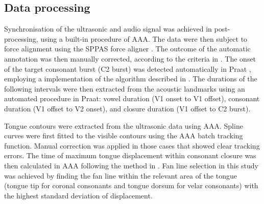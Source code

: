 \documentclass[authoryear, twocolumn]{elsarticle}
\begin{document}
\subsection{Data processing}\label{data-processing}

Synchronisation of the ultrasonic and audio signal was achieved in
post-processing, using a built-in procedure of AAA. The data were then
subject to force alignment using the SPPAS force aligner
\citep{bigi2015}. The outcome of the automatic annotation was then
manually corrected, according to the criteria in .
The onset of the target consonant burst (C2 burst) was detected
automatically in Praat \citep{boersma2016}, employing a implementation
of the algorithm described in \citet{ananthapadmanabha2014}. The
durations of the following intervals were then extracted from the
acoustic landmarks using an automated procedure in Praat: vowel duration
(V1 onset to V1 offset), consonant duration (V1 offset to V2 onset), and
closure duration (V1 offset to C2 burst).


Tongue contours were extracted from the ultrasonic data using AAA.
Spline curves were first fitted to the visible contours using the AAA
batch tracking function. Manual correction was applied in those cases
that showed clear tracking errors. The time of maximum tongue
displacement within consonant closure was then calculated in AAA
following the method in \citet{strycharczuk2015}. Fan line selection in
this study was achieved by finding the fan line within the relevant area
of the tongue (tongue tip for coronal consonants and tongue dorsum for
velar consonants) with the highest standard deviation of displacement.
\end{document}
